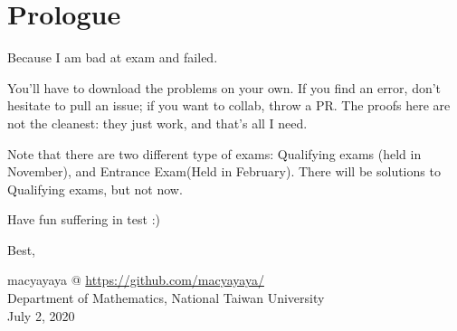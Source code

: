 \thispagestyle{empty}
\begin{center}
\end{center}
	
\vspace{10cm}

\section*{Prologue}
Because I am bad at exam and failed.

\vspace{1cm}
You'll have to download the problems on your own. If you find an error, don't hesitate to pull an issue; if you want to collab, throw a PR. The proofs here are not the cleanest: they just work, and that's all I need.

Note that there are two different type of exams: Qualifying exams (held in November), and Entrance Exam(Held in February). There will be solutions to Qualifying exams, but not now.

Have fun suffering in test :) 

Best, 
\begin{flushright}
macyayaya @ \href{https://github.com/macyayaya/}{https://github.com/macyayaya/} \\
Department of Mathematics, National Taiwan University \\
July 2, 2020
\end{flushright}
